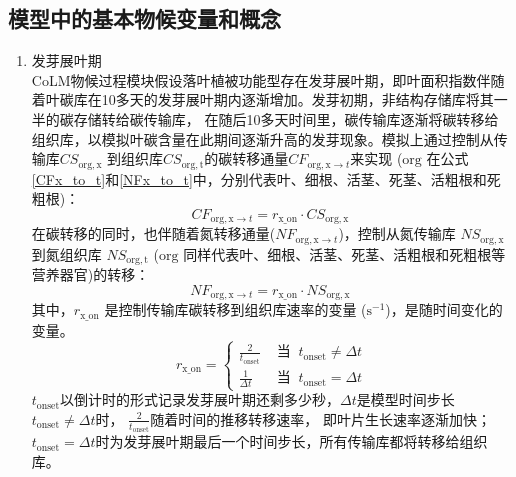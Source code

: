 \subsection{模型中的基本物候变量和概念}\label{模型中的基本物候变量和概念}

\begin{enumerate}
    \renewcommand{\theenumi}{\alph{enumi}}
  \item 发芽展叶期\\
    CoLM物候过程模块假设落叶植被功能型存在发芽展叶期，即叶面积指数伴随着叶碳库在10多天的发芽展叶期内逐渐增加。发芽初期，非结构存储库将其一半的碳存储转给碳传输库，
    在随后10多天时间里，碳传输库逐渐将碳转移给组织库，以模拟叶碳含量在此期间逐渐升高的发芽现象。模拟上通过控制从传输库$CS_{\mathrm{org,{x}}}$
    到组织库$CS_{\mathrm{org,t}}$的碳转移通量$CF_{\mathrm{org,{x}}\rightarrow {t}}$来实现
    (${\mathrm {org}}$ 在公式\eqref{CFx_to_t}和\eqref{NFx_to_t}中，分别代表叶、细根、活茎、死茎、活粗根和死粗根)：
    \begin{equation}\label{CFx_to_t}
      CF_{\mathrm{org,{x}}\rightarrow t} = r_{\mathrm{{x}}\_{\mathrm{on}}}\cdot CS_{\mathrm{org,{x}}}\
    \end{equation}
    在碳转移的同时，也伴随着氮转移通量($NF_{\mathrm{org,{x}}\rightarrow t}$)，控制从氮传输库 $NS_{\mathrm{org,{x}}}$ 到氮组织库 $NS_{\mathrm{org,t}}$ (${\mathrm {org}}$ 同样代表叶、细根、活茎、死茎、活粗根和死粗根等营养器官)的转移：
    \begin{equation}\label{NFx_to_t}
      NF_{\mathrm{org,{x}}\rightarrow t} = r_{\mathrm{{x}}\_{\mathrm{on}}}\cdot NS_{\mathrm{org,{x}}}\
    \end{equation}
    其中，$r_{\mathrm{{x}}\_{\mathrm{on}}}$ 是控制传输库碳转移到组织库速率的变量 ($\mathrm{s^{-1}}$)，是随时间变化的变量。
    \begin{equation}
      r_{\mathrm{x\_{on}}}=\begin{cases}
        \frac{2}{t_{\mathrm{ {onset}}}} &  \text{ 当 }\ t_{\mathrm{ {onset}}} \neq \Delta t \\
        \frac{1}{\Delta t} &  \text{ 当 }\ t_{\mathrm{onset}}=\Delta t
      \end{cases}
    \end{equation}
    $t_{\mathrm{onset}}$以倒计时的形式记录发芽展叶期还剩多少秒，$\Delta t$是模型时间步长$t_{\mathrm{onset}}\neq\Delta t$时，
    $\frac{2}{t_{\mathrm{onset}}}$随着时间的推移转移速率，
    即叶片生长速率逐渐加快；$t_{\mathrm{onset}}=\Delta t$时为发芽展叶期最后一个时间步长，所有传输库都将转移给组织库。


\end{enumerate}
